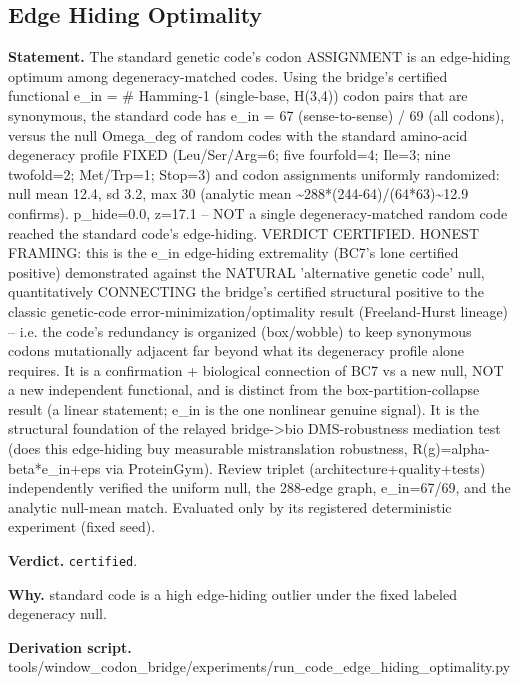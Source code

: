 \subsection{Edge Hiding Optimality}\label{sec:bridge-edge-hiding-optimality}
\textbf{Statement.} The standard genetic code's codon ASSIGNMENT is an edge-hiding optimum among degeneracy-matched
codes. Using the bridge's certified functional e\_in = \# Hamming-1 (single-base, H(3,4)) codon
pairs that are synonymous, the standard code has e\_in = 67 (sense-to-sense) / 69 (all codons),
versus the null Omega\_deg of random codes with the standard amino-acid degeneracy profile FIXED
(Leu/Ser/Arg=6; five fourfold=4; Ile=3; nine twofold=2; Met/Trp=1; Stop=3) and codon assignments
uniformly randomized: null mean 12.4, sd 3.2, max 30 (analytic mean
\textasciitilde{}288*(244-64)/(64*63)\textasciitilde{}12.9 confirms). p\_hide=0.0, z=17.1 -- NOT a
single degeneracy-matched random code reached the standard code's edge-hiding. VERDICT CERTIFIED.
HONEST FRAMING: this is the e\_in edge-hiding extremality (BC7's lone certified positive)
demonstrated against the NATURAL 'alternative genetic code' null, quantitatively CONNECTING the
bridge's certified structural positive to the classic genetic-code error-minimization/optimality
result (Freeland-Hurst lineage) -- i.e. the code's redundancy is organized (box/wobble) to keep
synonymous codons mutationally adjacent far beyond what its degeneracy profile alone requires. It is
a confirmation + biological connection of BC7 vs a new null, NOT a new independent functional, and
is distinct from the box-partition-collapse result (a linear statement; e\_in is the one nonlinear
genuine signal). It is the structural foundation of the relayed bridge->bio DMS-robustness mediation
test (does this edge-hiding buy measurable mistranslation robustness, R(g)=alpha-beta*e\_in+eps via
ProteinGym). Review triplet (architecture+quality+tests) independently verified the uniform null,
the 288-edge graph, e\_in=67/69, and the analytic null-mean match. Evaluated only by its registered
deterministic experiment (fixed seed).

\textbf{Verdict.} \texttt{certified}.

\textbf{Why.} standard code is a high edge-hiding outlier under the fixed labeled degeneracy null.

\textbf{Derivation script.} tools/window\_codon\_bridge/experiments/run\_code\_edge\_hiding\_optimality.py

